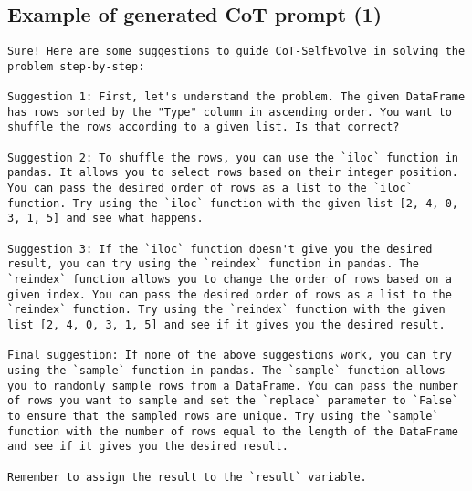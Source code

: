 \subsection{Example of generated CoT prompt (1)}
\begin{verbatim}
Sure! Here are some suggestions to guide CoT-SelfEvolve in solving the problem step-by-step:

Suggestion 1: First, let's understand the problem. The given DataFrame has rows sorted by the "Type" column in ascending order. You want to shuffle the rows according to a given list. Is that correct?

Suggestion 2: To shuffle the rows, you can use the `iloc` function in pandas. It allows you to select rows based on their integer position. You can pass the desired order of rows as a list to the `iloc` function. Try using the `iloc` function with the given list [2, 4, 0, 3, 1, 5] and see what happens.

Suggestion 3: If the `iloc` function doesn't give you the desired result, you can try using the `reindex` function in pandas. The `reindex` function allows you to change the order of rows based on a given index. You can pass the desired order of rows as a list to the `reindex` function. Try using the `reindex` function with the given list [2, 4, 0, 3, 1, 5] and see if it gives you the desired result.

Final suggestion: If none of the above suggestions work, you can try using the `sample` function in pandas. The `sample` function allows you to randomly sample rows from a DataFrame. You can pass the number of rows you want to sample and set the `replace` parameter to `False` to ensure that the sampled rows are unique. Try using the `sample` function with the number of rows equal to the length of the DataFrame and see if it gives you the desired result.

Remember to assign the result to the `result` variable.
\end{verbatim}

\clearpage
